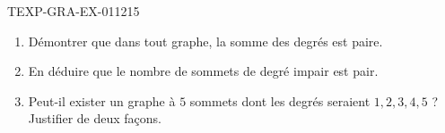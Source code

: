 \begin{exercice}{TEXP-GRA-EX-011}{2}{15}
\begin{enumerate}
  \item Démontrer que dans tout graphe, la somme des degrés est paire.
  \item En déduire que le nombre de sommets de degré impair est pair.
  \item Peut-il exister un graphe à $5$ sommets dont les degrés seraient
        $1,2,3,4,5$ ? Justifier de deux façons.
\end{enumerate}
\end{exercice}
